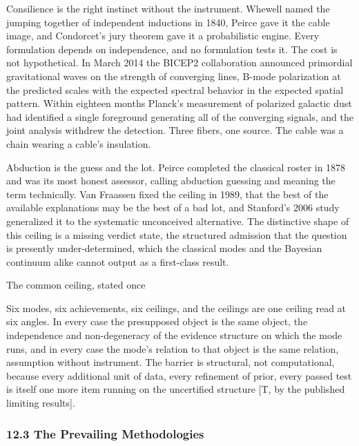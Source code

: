 \documentclass[10pt,twocolumn]{article}
\begin{document}
Consilience is the right instinct without the instrument. Whewell named
the jumping together of independent inductions in 1840, Peirce gave it
the cable image, and Condorcet's jury theorem gave it a probabilistic
engine. Every formulation depends on independence, and no formulation
tests it. The cost is not hypothetical. In March 2014 the BICEP2
collaboration announced primordial gravitational waves on the strength
of converging lines, B-mode polarization at the predicted scales with
the expected spectral behavior in the expected spatial pattern. Within
eighteen months Planck's measurement of polarized galactic dust had
identified a single foreground generating all of the converging signals,
and the joint analysis withdrew the detection. Three fibers, one source.
The cable was a chain wearing a cable's insulation.

Abduction is the guess and the lot. Peirce completed the classical
roster in 1878 and was its most honest assessor, calling abduction
guessing and meaning the term technically. Van Fraassen fixed the
ceiling in 1989, that the best of the available explanations may be the
best of a bad lot, and Stanford's 2006 study generalized it to the
systematic unconceived alternative. The distinctive shape of this
ceiling is a missing verdict state, the structured admission that the
question is presently under-determined, which the classical modes and
the Bayesian continuum alike cannot output as a first-class result.

\begin{jbox}{The common ceiling, stated once}

Six modes, six achievements, six ceilings, and the ceilings are one
ceiling read at six angles. In every case the presupposed object is the
same object, the independence and non-degeneracy of the evidence
structure on which the mode runs, and in every case the mode's relation
to that object is the same relation, assumption without instrument. The
barrier is structural, not computational, because every additional unit
of data, every refinement of prior, every passed test is itself one more
item running on the uncertified structure {[}T, by the published
limiting results{]}.

\end{jbox}

\hypertarget{the-prevailing-methodologies}{%
\subsubsection{12.3 The Prevailing
Methodologies}\label{the-prevailing-methodologies}}
\end{document}
